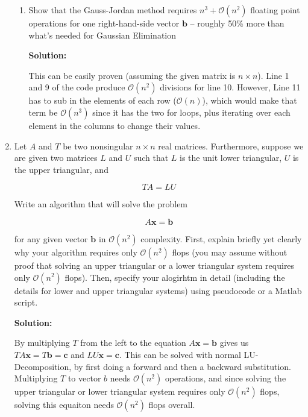 \documentclass[12pt]{article}
\newcommand{\BigO}[1]{\mathcal{O}\left( #1 \right)}
\begin{document}
\begin{enumerate}
\begin{enumerate}
\item Show that the Gauss-Jordan method requires $n^{3} + \BigO{n^{2}}$ floating point operations
for one right-hand-side vector $\mathbf{b}$ -- roughly 50\% more than what's needed for Gaussian Elimination

{\bf Solution:}

This can be easily proven (assuming the given matrix is $n\times n$). Line 1
and 9 of the code produce $\BigO{n^{2}}$ divisions for line 10. However, Line 11
has to sub in the elements of each row ($\BigO{n}$), which would make that term
be $\BigO{n^{3}}$ since it has the two for loops, plus iterating over each element
in the columns to change their values.


\end{enumerate}

\item Let $A$ and $T$ be two nonsingular $n \times n$ real matrices. Furthermore, suppose we are given
two matrices $L$ and $U$ such that $L$ is the unit lower triangular, $U$ is the upper triangular, and

\[
TA = LU
\]

Write an algorithm that will solve the problem

\[
A\mathbf{x} = \mathbf{b}
\]

for any given vector $\mathbf{b}$ in $\BigO{n^{2}}$ complexity. First, explain briefly yet clearly
why your algorithm requires only $\BigO{n^{2}}$ flops (you may assume without proof that solving an upper triangular
or a lower triangular system requires only $\BigO{n^{2}}$ flops). Then, specify your alogirhtm in detail
(including the details for lower and upper triangular systems) using pseudocode or a {\sc Matlab} script.

{\bf Solution:}

By multiplying $T$ from the left to the equation $A\mathbf{x} = \mathbf{b}$ gives us
$TA\mathbf{x} = T\mathbf{b} = \mathbf{c}$ and $LU\mathbf{x} = \mathbf{c}$. This can be
solved with normal LU-Decomposition, by first doing a forward and then a backward substitution.
Multiplying $T$ to vector $b$ needs $\BigO{n^{2}}$ operations, and since solving the
upper triangular or lower triangular system requires only $\BigO{n^{2}}$ flops, solving this
equaiton needs $\BigO{n^{2}}$ flops overall.



\end{enumerate}
\end{document}
